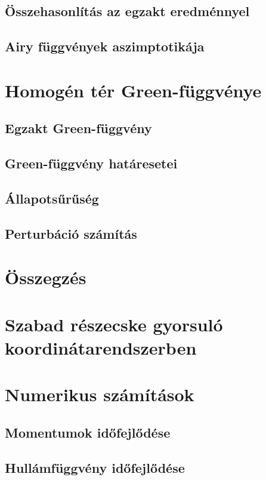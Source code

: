\documentclass[pdftex,12pt,a4paper]{article}
\begin{document}
	\subsection{Összehasonlítás az egzakt eredménnyel}
		
	\subsection{Airy függvények aszimptotikája}
		
\section{Homogén tér Green-függvénye}
	
	\subsection{Egzakt Green-függvény}
		
	\subsection{Green-függvény határesetei}
		
	\subsection{Állapotsűrűség}
		
	\subsection{Perturbáció számítás}
		
\section{Összegzés}
	
\appendix
\section{Szabad részecske gyorsuló koordinátarendszerben}
	
\section{Numerikus számítások}
	\subsection{Momentumok időfejlődése}
		
	\subsection{Hullámfüggvény időfejlődése}
\end{document}
